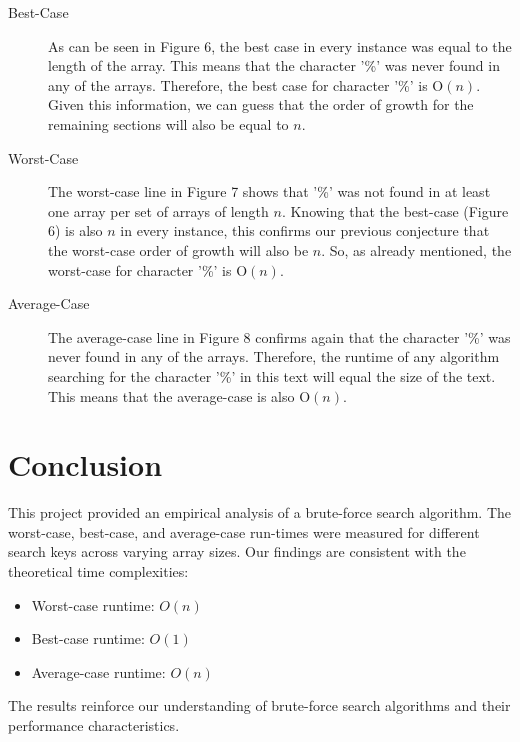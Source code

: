 \documentclass{article}
\begin{document}
\begin{description}
    \item[Best-Case] As can be seen in Figure 6, the best case in every instance was equal to the length of the array. This means that the character '\%' was never found in any of the arrays. Therefore, the best case for character '\%' is O$(n)$. Given this information, we can guess that the order of growth for the remaining sections will also be equal to $n$.
    \item[Worst-Case] The worst-case line in Figure 7 shows that '\%' was not found in at least one array per set of arrays of length $n$. Knowing that the best-case (Figure 6) is also $n$ in every instance, this confirms our previous conjecture that the worst-case order of growth will also be $n$. So, as already mentioned, the worst-case for character '\%' is O$(n)$.
    \item[Average-Case] The average-case line in Figure 8 confirms again that the character '\%' was never found in any of the arrays. Therefore, the runtime of any algorithm searching for the character '\%' in this text will equal the size of the text. This means that the average-case is also O$(n)$.
\end{description}

\section{Conclusion}
This project provided an empirical analysis of a brute-force search algorithm. The worst-case, best-case, and average-case run-times were measured for different search keys across varying array sizes. Our findings are consistent with the theoretical time complexities:
	
    \begin{itemize}
        \item Worst-case runtime: \( O(n) \)
	\item Best-case runtime: \( O(1) \)
	\item Average-case runtime: \( O(n) \)
    \end{itemize}
The results reinforce our understanding of brute-force search algorithms and their performance characteristics.
\end{document}
